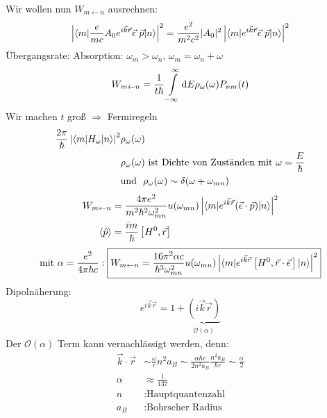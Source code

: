 	Wir wollen nun $W_{m \leftarrow n}$ ausrechnen:
		\begin{align*}
			\left|\braket{m | \frac{e}{m c} A_0 e^{i \vec{k} \vec{r}} \vec{\epsilon}~\vec{p} |n}\right|^2
			= \frac{e^2}{m^2 c^2} |A_0|^2 \left| \braket{m | e^{i \vec{k} \vec{r}} \vec{\epsilon}~\vec{p} | n}\right|^2
		\end{align*}
	Übergangsrate: Absorption: $\omega_m > \omega_n$, $\omega_m = \omega_n + \omega$
		\begin{equation*}
			W_{m \leftarrow n} = 
			\frac{1}{t \hbar} \int \limits_{-\infty}^{\infty} 
			\mathrm{d} E \rho_\omega (\omega) P_{nm} (t)
		\end{equation*}
	Wir machen $t$ groß $\Rightarrow$ Fermiregeln
		\begin{align*}
			\frac{2 \pi}{\hbar} \left|\braket{m | H_\omega | n}\right|^2 &\rho_\omega (\omega) \\
			&\rho_\omega (\omega) \text{~ist Dichte von Zuständen mit~} \omega = \frac{E}{\hbar} \\
			&\text{und~ }\rho_\omega (\omega)\sim \delta (\omega + \omega_{mn})
		\end{align*}
		\begin{align*}
			W_{m \leftarrow n} &= 
			\frac{4 \pi e^2}{m^2 \hbar^2 \omega_{mn}^2} u(\omega_{mn}) 
			\left|\braket{m | e^{i \vec{k} \vec{r}} (\vec{\epsilon} \cdot \vec{p}) | n}\right|^2 \\
			\langle {\hat{p}} \rangle &= \frac{i m}{\hbar} \left[H^0 , \vec{r} \right] 
		\end{align*}
		\begin{align*}
			\text{mit~}\alpha = \frac{e^2}{4 \pi \hbar c} :
			\boxed{W_{m \leftarrow n} = \frac{16 \pi^2 \alpha c}{\hbar^3 \omega_{mn}^2} 
				u (\omega_{mn}) \left|\braket{m | e^{i \vec{k} \vec{r}} \left[H^0 , \vec{r} \cdot \vec{\epsilon}\,\right] | n}\right|^2
			}
		\end{align*}
	Dipolnäherung: 
		\begin{equation*}
			e^{i \vec{k} \vec{r}} = 1 + 
			\underbrace{(i \vec{k} \vec{r})}_{\substack{\mathcal{O}(\alpha)}}
		\end{equation*}
	Der $\mathcal{O}(\alpha)$ Term kann vernachlässigt werden, denn:
		\begin{align*}
			\vec{k} \cdot \vec{r} 
			&\sim \frac{\omega}{c} n^2 a_B
			\sim \frac{\alpha \hbar c}{2 n^2 a_B} \frac{n^2 a_B}{\hbar c}
			\sim \frac{\alpha}{2} \\
			\alpha &\approx \frac{1}{137} \\
			n &: \text{Hauptquantenzahl} \\	
			a_B &: \text{Bohrscher Radius}		
		\end{align*}
